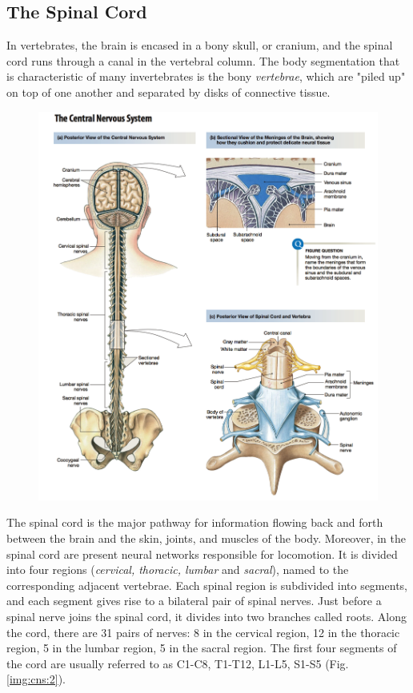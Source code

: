 \documentclass[a4paper,11pt,openright,twoside]{book}
\begin{document}
\subsection{The Spinal Cord}
In vertebrates, the brain is encased in a bony skull, or cranium, and the spinal cord runs through a canal in the vertebral column. The body segmentation that is characteristic of many invertebrates is the bony \emph{vertebrae}, which are "piled up" on top of one another and separated by disks of connective tissue. 

\newpage

\begin{figure}[h!]
\centering
\includegraphics[width=\textwidth]{images/spinal_cord}
\label{img:cns:1}
\end{figure}

\newpage

The spinal cord is the major pathway for information flowing back and forth between the brain and the skin, joints, and muscles of the body. Moreover, in the spinal cord are present neural networks responsible for locomotion. It is divided into four regions (\emph{cervical, thoracic, lumbar} and \emph{sacral}), named to the corresponding adjacent vertebrae. Each spinal region is subdivided into segments, and each segment gives rise to a bilateral pair of spinal nerves. Just before a spinal nerve joins the spinal cord, it divides into two branches called roots. Along the cord, there are 31 pairs of nerves: 8 in the cervical region, 12 in the thoracic region, 5 in the lumbar region, 5 in the sacral region. The first four segments of the cord are usually referred to as C1-C8, T1-T12, L1-L5, S1-S5 (Fig. \ref{img:cns:2}).
\end{document}
